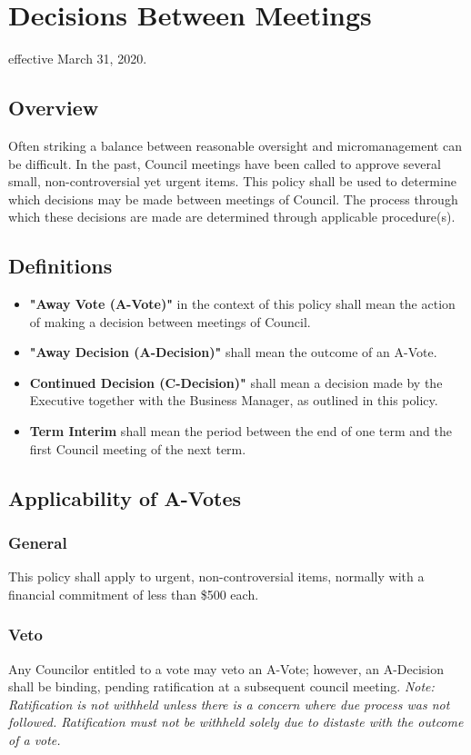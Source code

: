 \section{Decisions Between Meetings}
effective March 31, 2020.

\subsection{Overview}
Often striking a balance between reasonable oversight and micromanagement can be difficult.  In
the past, Council meetings have been called to approve several small, non-controversial yet 
urgent items.  This policy shall be used to determine which decisions may be made between 
meetings of Council.  The process through which these decisions are made are determined through applicable procedure(s).

\subsection{Definitions}
\begin{itemize}
    \item \textbf{"Away Vote (A-Vote)"} in the context of this policy shall mean the action of making a decision between meetings of Council. 
    \item \textbf{"Away Decision (A-Decision)"} shall mean the outcome of an A-Vote.
    \item \textbf{Continued Decision (C-Decision)"} shall mean a decision made by the Executive together with the Business Manager, as outlined in this policy. 
    \item \textbf{Term Interim} shall mean the period between the end of one term and the first Council meeting of the next term.
\end{itemize}

\subsection{Applicability of A-Votes}

\subsubsection{General}
This policy shall apply to urgent, non-controversial items, normally with a financial commitment 
of less than \$500 each.

\subsubsection{Veto}
Any Councilor entitled to a vote may veto an A-Vote; however, an A-Decision shall be binding, 
pending ratification at a subsequent council meeting.
\textit{Note: Ratification is not withheld unless there is a concern where due process was not 
followed. Ratification must not be withheld solely due to distaste with the outcome of a vote.}

